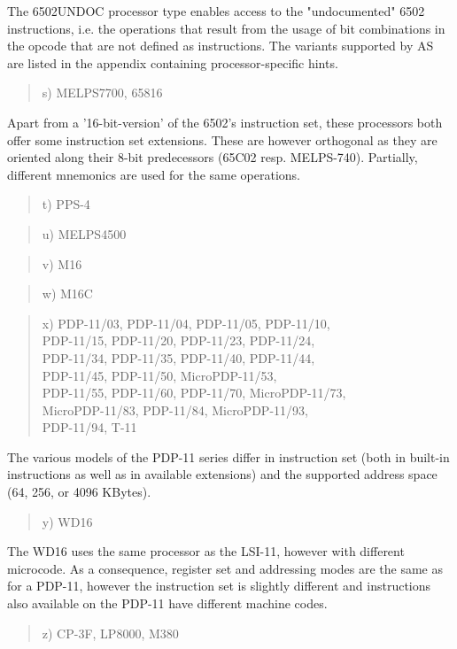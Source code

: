 \documentclass[12pt,twoside]{report}
\newcommand{\asname}{{AS}}
\begin{document}
The 6502UNDOC processor type enables access to the "undocumented"
6502 instructions, i.e. the operations that result from the usage of bit
combinations in the opcode that are not defined as instructions.  The
variants supported by \asname{} are listed in the appendix containing processor-specific
hints.
\begin{quote}
s) MELPS7700, 65816
\end{quote}
Apart from a '16-bit-version' of the 6502's instruction set, these
processors both offer some instruction set extensions.  These are
however orthogonal as they are oriented along their 8-bit
predecessors (65C02 resp. MELPS-740).  Partially, different
mnemonics are used for the same operations.
\begin{quote}
t) PPS-4
\end{quote}
\begin{quote}
u) MELPS4500
\end{quote}
\begin{quote}
v) M16
\end{quote}
\begin{quote}
w) M16C
\end{quote}
\begin{quote}
x) PDP-11/03, PDP-11/04, PDP-11/05, PDP-11/10,\\
   PDP-11/15, PDP-11/20, PDP-11/23, PDP-11/24,\\
   PDP-11/34, PDP-11/35, PDP-11/40, PDP-11/44,\\
   PDP-11/45, PDP-11/50, MicroPDP-11/53,\\
   PDP-11/55, PDP-11/60, PDP-11/70, MicroPDP-11/73,\\
   MicroPDP-11/83, PDP-11/84, MicroPDP-11/93,\\
   PDP-11/94, T-11
\end{quote}
The various models of the PDP-11 series differ in instruction
set (both in built-in instructions as well as in available extensions)
and the supported address space (64, 256, or 4096 KBytes).
\begin{quote}
y) WD16
\end{quote}
The WD16 uses the same processor as the LSI-11, however
with different microcode.  As a consequence, register set
and addressing modes are the same as for a PDP-11, however
the instruction set is slightly different and instructions
also available on the PDP-11 have different machine codes.
\begin{quote}
z) CP-3F, LP8000, M380
\end{quote}
\end{document}
